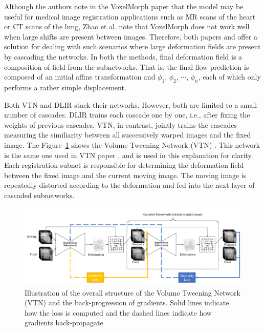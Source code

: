 \documentclass{report}
\begin{document}
	Although the authors note in the VoxelMorph paper \cite{Balakrishnan_2019} that the model may be useful for medical image registration applications such as MR scans of the heart or CT scans of the lung, Zhao et al. \cite{8889674} note that VoxelMorph does not work well when large shifts are present between images. Therefore, both papers \cite{8889674} and \cite{Balakrishnan_2019} offer a solution for dealing with such scenarios where large deformation fields are present by cascading the networks. In both the methods, final deformation field is a composition of field from the subnetworks. That is, the final flow prediction is composed of an initial affine transformation and $\phi_1$, $\phi_2$, $\cdots$, $\phi_n$, each of which only performs a rather simple displacement.
	
	Both VTN \cite{8889674} and DLIR \cite{de_Vos_2019} stack their networks. However, both are limited to a small number of cascades. DLIR trains each cascade one by one, i.e., after fixing the weights of previous cascades. VTN, in contrast, jointly trains the cascades measuring the similiarity between all successively warped images and the fixed image. The Figure~\ref{fig:vtn} shows the Volume Tweening Network (VTN) \cite{8889674}. This network is the same one used in VTN paper \cite{8889674}, and is used in this explanation for clarity. Each registration subnet is responsible for determining the deformation field between the fixed image and the current moving image. The moving image is repeatedly distorted according to the deformation and fed into the next layer of cascaded subnetworks.
	
	\begin{figure}[h]
		\centering
		\includegraphics[width=\columnwidth]{resources/chapter2/vtn.png}
		\caption{Illustration of the overall structure of the Volume Tweening Network (VTN) and the back-progression of gradients. Solid lines indicate how the loss is computed and the dashed lines indicate how gradients back-propagate\cite{8889674}}
		\label{fig:vtn}
	\end{figure}
	
\end{document}
